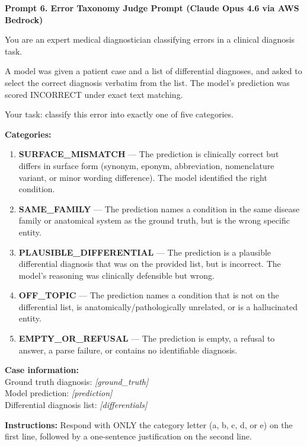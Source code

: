 \documentclass[10pt,journal,compsoc, onecolumn]{IEEEtran}
\begin{document}
\begin{baselinebox}
    \textbf{Prompt 6. Error Taxonomy Judge Prompt (Claude Opus 4.6 via AWS Bedrock)}

    \vspace{1em}
    You are an expert medical diagnostician classifying errors in a clinical diagnosis task.

    \vspace{0.5em}
    A model was given a patient case and a list of differential diagnoses, and asked to select the correct diagnosis verbatim from the list. The model's prediction was scored INCORRECT under exact text matching.

    \vspace{0.5em}
    Your task: classify this error into exactly one of five categories.

    \vspace{0.5em}
    \textbf{Categories:}
    \begin{enumerate}[label=(\alph*), leftmargin=*, noitemsep, topsep=2pt]
        \item \textbf{SURFACE\_MISMATCH} --- The prediction is clinically correct but differs in surface form (synonym, eponym, abbreviation, nomenclature variant, or minor wording difference). The model identified the right condition.
        \item \textbf{SAME\_FAMILY} --- The prediction names a condition in the same disease family or anatomical system as the ground truth, but is the wrong specific entity.
        \item \textbf{PLAUSIBLE\_DIFFERENTIAL} --- The prediction is a plausible differential diagnosis that was on the provided list, but is incorrect. The model's reasoning was clinically defensible but wrong.
        \item \textbf{OFF\_TOPIC} --- The prediction names a condition that is not on the differential list, is anatomically/pathologically unrelated, or is a hallucinated entity.
        \item \textbf{EMPTY\_OR\_REFUSAL} --- The prediction is empty, a refusal to answer, a parse failure, or contains no identifiable diagnosis.
    \end{enumerate}

    \vspace{0.5em}
    \textbf{Case information:}
    \\
    Ground truth diagnosis: \textit{[ground\_truth]}
    \\
    Model prediction: \textit{[prediction]}
    \\
    Differential diagnosis list: \textit{[differentials]}

    \vspace{0.5em}
    \textbf{Instructions:}
    Respond with ONLY the category letter (a, b, c, d, or e) on the first line, followed by a one-sentence justification on the second line.
\end{baselinebox}
\end{document}
